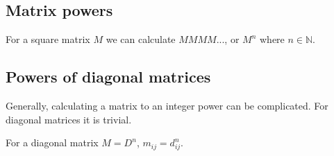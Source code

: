 
\subsection{Matrix powers}

For a square matrix \(M\) we can calculate \(MMMM...\), or \(M^n\) where \(n\in \mathbb{N}\).

\subsection{Powers of diagonal matrices}

Generally, calculating a matrix to an integer power can be complicated. For diagonal matrices it is trivial.

For a diagonal matrix \(M=D^n\), \(m_{ij}=d_{ij}^n\).

